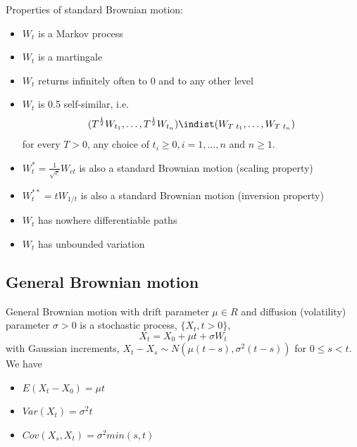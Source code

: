 \documentclass[11pt,a4paper]{book}
\theoremstyle{definition}\newtheorem{definition}{Definition}
\theoremstyle{definition}\newtheorem{fact}{Fact}
\theoremstyle{definition}\newtheorem{remark}{Remark}
\theoremstyle{definition}\newtheorem{ex}{Ex.}
\theoremstyle{definition}\newtheorem{project}{Project}
\theoremstyle{definition}\newtheorem{problem}{Problem}
\theoremstyle{definition}\newtheorem{example}{Example}
\numberwithin{theorem}{section}
\numberwithin{corollary}{chapter}
\numberwithin{assumption}{chapter}
\numberwithin{definition}{chapter}
\numberwithin{prop}{chapter}
\numberwithin{notation}{chapter}
\numberwithin{problem}{chapter}
\numberwithin{example}{chapter}
\numberwithin{fact}{chapter}
\numberwithin{ex}{chapter}
\begin{document}
Properties of standard Brownian motion:
\begin{itemize}
\item $W_t$ is a Markov process
\item $W_t$ is a martingale
\item $W_t$ returns infinitely often to 0 and to any other level
\item $W_t$ is 0.5 self-similar, i.e.
$$(T^{\frac{1}{2}} W_{t_1}, \ldots, T^{\frac{1}{2}} W_{t_n}) \indist (W_{T\,\,t_1}, \ldots, W_{T\,\,t_n})$$
for every $T>0$, any choice of $t_i \geq 0, i = 1, ..., n$ and $n \geq 1$.
\item $W_t^* = \frac{1}{\sqrt{c}} W_{ct}$ is also a standard Brownian motion (scaling property)
\item $W_t^{{**}} = t W_{1/t}$ is also a standard Brownian motion (inversion property)
\item $W_t$ has nowhere differentiable paths
\item $W_t$ has unbounded variation
\end{itemize}

\subsection{General Brownian motion}
General Brownian motion with drift parameter $\mu \in R$ and diffusion (volatility) parameter $\sigma > 0$ is a stochastic process, $\{X_t,t>0\}$,
$$ X_t = X_0 + \mu t + \sigma W_t $$
with Gaussian increments, $X_t - X_s \sim N(\mu(t-s), \sigma^2(t-s))$ for $0 \leq s < t$. We have
\begin{itemize}
\item $E(X_t - X_0) = \mu t$
\item $Var(X_t) = \sigma^2 t$
\item $Cov(X_s, X_t) = \sigma^2 min(s,t)$
\end{itemize}
\end{document}
